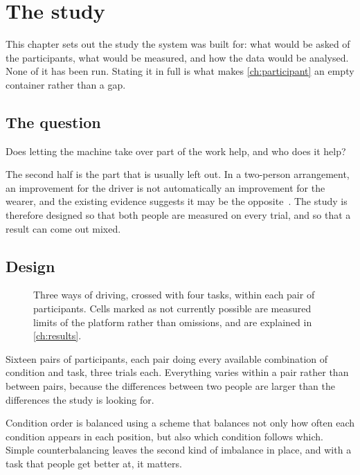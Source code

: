 \chapter{The study}
\label{ch:study}

This chapter sets out the study the system was built for: what would be asked
of the participants, what would be measured, and how the data would be
analysed. None of it has been run. Stating it in full is what makes
\cref{ch:participant} an empty container rather than a gap.

\section{The question}

Does letting the machine take over part of the work help, and who does it
help?

The second half is the part that is usually left out. In a two-person
arrangement, an improvement for the driver is not automatically an improvement
for the wearer, and the existing evidence suggests it may be the
opposite~\cite{zhou2026proxemics}. The study is therefore designed so that
both people are measured on every trial, and so that a result can come out
mixed.

\section{Design}

\begin{figure}[htbp]
  \centering
  
  \caption[The study design]{Three ways of driving, crossed with four tasks,
  within each pair of participants. Cells marked as not currently possible are
  measured limits of the platform rather than omissions, and are explained in
  \cref{ch:results}.}
  \label{fig:design}
\end{figure}

Sixteen pairs of participants, each pair doing every available combination of
condition and task, three trials each. Everything varies within a pair rather
than between pairs, because the differences between two people are larger than
the differences the study is looking for.

Condition order is balanced using a scheme that balances not only how often
each condition appears in each position, but also which condition follows
which. Simple counterbalancing leaves the second kind of imbalance in place,
and with a task that people get better at, it matters.

